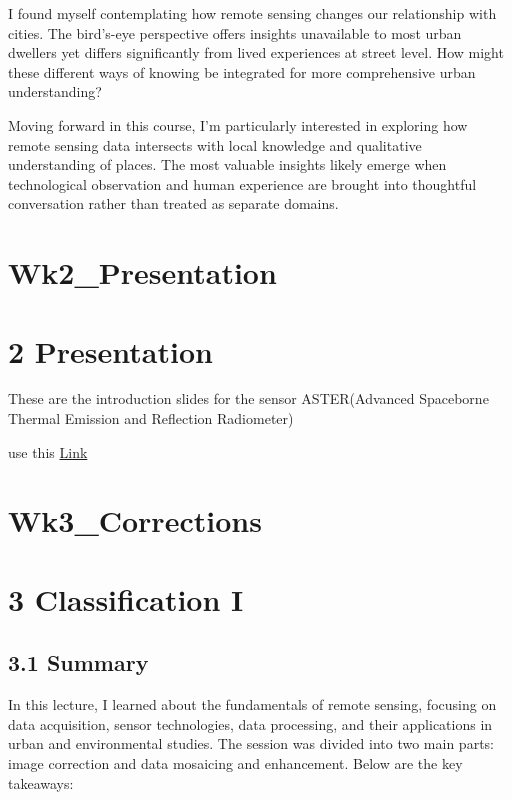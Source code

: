 \documentclass[
  letterpaper,
  DIV=11,
  numbers=noendperiod]{scrreprt}
\begin{document}
I found myself contemplating how remote sensing changes our relationship
with cities. The bird's-eye perspective offers insights unavailable to
most urban dwellers yet differs significantly from lived experiences at
street level. How might these different ways of knowing be integrated
for more comprehensive urban understanding?

Moving forward in this course, I'm particularly interested in exploring
how remote sensing data intersects with local knowledge and qualitative
understanding of places. The most valuable insights likely emerge when
technological observation and human experience are brought into
thoughtful conversation rather than treated as separate domains.


\chapter{Wk2\_Presentation}\label{wk2_presentation}


\chapter{2 Presentation}\label{presentation}

These are the introduction slides for the sensor ASTER(Advanced
Spaceborne Thermal Emission and Reflection Radiometer)

use this
\href{https://lydia0930.github.io/CASA0023xaringan/w2-slides.html}{Link}


\chapter{Wk3\_Corrections}\label{wk3_corrections}


\chapter{3 Classification I}\label{classification-i}

\section{3.1 Summary}\label{summary-1}

In this lecture, I learned about the fundamentals of remote sensing,
focusing on data acquisition, sensor technologies, data processing, and
their applications in urban and environmental studies. The session was
divided into two main parts: image correction and data mosaicing and
enhancement. Below are the key takeaways:
\end{document}
